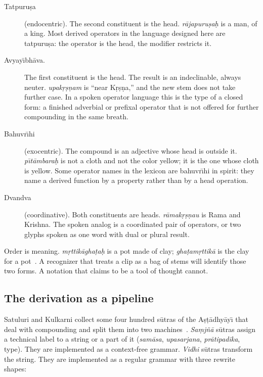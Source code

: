\documentclass[manuscript, review, anonymous]{acmart}
\begin{document}
\begin{description}
\item[Tatpuru{\d{s}}a] (endocentric). The second constituent is the head. \textit{r{\=a}japuru{\d{s}}a{\d{h}}} is a man, of a king. Most derived operators in the language designed here are tatpuru{\d{s}}a: the operator is the head, the modifier restricts it.
\item[Avyay{\=\i}bh{\=a}va.] The first constituent is the head. The result is an indeclinable, always neuter. \textit{upak{\d{r}}{\d{s}}{\d{n}}am} is ``near K{\d{r}}{\d{s}}{\d{n}}a,'' and the new stem does not take further case. In a spoken operator language this is the type of a closed form: a finished adverbial or prefixal operator that is not offered for further compounding in the same breath.
\item[Bahuvr{\=\i}hi] (exocentric). The compound is an adjective whose head is outside it. \textit{p{\=\i}t{\=a}mbara{\d{h}}} is not a cloth and not the color yellow; it is the one whose cloth is yellow. Some operator names in the lexicon are bahuvr{\=\i}hi in spirit: they name a derived function by a property rather than by a head operation.
\item[Dvandva] (coordinative). Both constituents are heads. \textit{r{\=a}mak{\d{r}}{\d{s}}{\d{n}}au} is Rama and Krishna. The spoken analog is a coordinated pair of operators, or two glyphs spoken as one word with dual or plural result.
\end{description}

Order is meaning. \textit{m{\d{r}}ttik{\=a}gha{\d{t}}a{\d{h}}} is a pot made of clay; \textit{gha{\d{t}}am{\d{r}}ttik{\=a}} is the clay for a pot~\cite{Satuluri2013Generation}. A recognizer that treats a clip as a bag of stems will identify those two forms. A notation that claims to be a tool of thought cannot.

\subsection{The derivation as a pipeline}

Satuluri and Kulkarni collect some four hundred s{\=u}tras of the A{\d{s}}{\d{t}}{\=a}dhy{\=a}y{\=\i} that deal with compounding and split them into two machines~\cite{Satuluri2013Generation}. \textit{Sa{\d{m}}j{\~n}{\=a}} s{\=u}tras assign a technical label to a string or a part of it (\textit{sam{\=a}sa}, \textit{upasarjana}, \textit{pr{\=a}tipadika}, type). They are implemented as a context-free grammar. \textit{Vidhi} s{\=u}tras transform the string. They are implemented as a regular grammar with three rewrite shapes:
\end{document}
